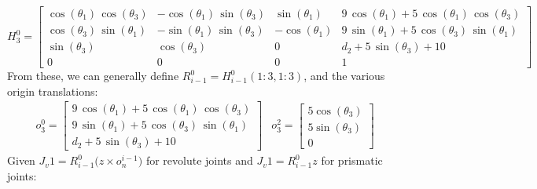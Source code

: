 \documentclass[11pt]{article}
\begin{document}
$$
H^0_3=
\begin{bmatrix}
\cos\left(\theta _{1}\right)\,\cos\left(\theta _{3}\right) & -\cos\left(\theta _{1}\right)\,\sin\left(\theta _{3}\right) & \sin\left(\theta _{1}\right) & 9\,\cos\left(\theta _{1}\right)+5\,\cos\left(\theta _{1}\right)\,\cos\left(\theta _{3}\right)\\ 
\cos\left(\theta _{3}\right)\,\sin\left(\theta _{1}\right) & -\sin\left(\theta _{1}\right)\,\sin\left(\theta _{3}\right) & -\cos\left(\theta _{1}\right) & 9\,\sin\left(\theta _{1}\right)+5\,\cos\left(\theta _{3}\right)\,\sin\left(\theta _{1}\right)\\ 
\sin\left(\theta _{3}\right) & \cos\left(\theta _{3}\right) & 0 & d_{2}+5\,\sin\left(\theta _{3}\right)+10\\ 
0 & 0 & 0 & 1
\end{bmatrix}
$$
From these, we can generally define $R^0_{i-1} = H^0_{i-1}(1:3,1:3)$, and the various origin translations:
\begin{align*}
o^0_3=
\begin{bmatrix}
9\,\cos\left(\theta _{1}\right)+5\,\cos\left(\theta _{1}\right)\,\cos\left(\theta _{3}\right)\\ 
9\,\sin\left(\theta _{1}\right)+5\,\cos\left(\theta _{3}\right)\,\sin\left(\theta _{1}\right)\\ 
d_{2}+5\,\sin\left(\theta _{3}\right)+10
\end{bmatrix}
& 
o^2_3=
\begin{bmatrix}
5\cos\left(\theta _{3}\right)\\ 
5\sin\left(\theta _{3}\right)\\
0 
\end{bmatrix}
\end{align*}
Given $J_v1=R^0_{i-1}\big(z\times o^{i-1}_n\big)$ for revolute joints and $J_v1=R^0_{i-1}z$ for prismatic joints:
\end{document}
